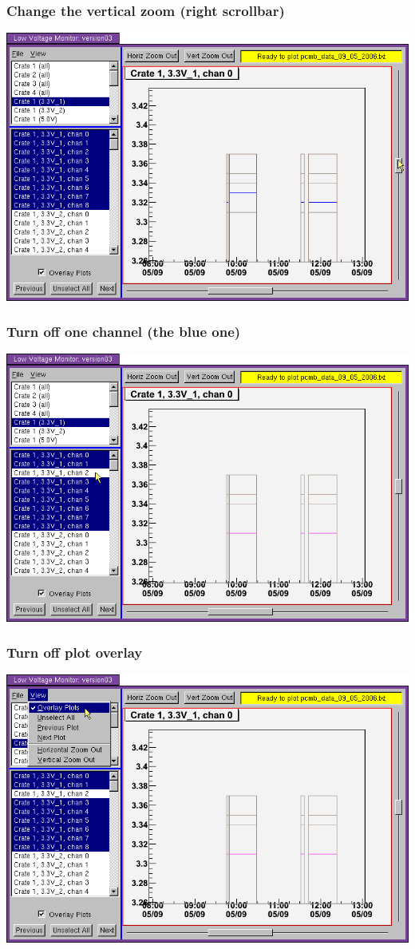 \documentclass[12pt,compress]{beamer}
\begin{document}
\begin{frame}
\frametitle{Change the vertical zoom (right scrollbar)}
\begin{center}
\includegraphics[width=0.9\linewidth]{09.png}
\end{center}
\end{frame}

\begin{frame}
\frametitle{Turn off one channel (the blue one)}
\begin{center}
\includegraphics[width=0.9\linewidth]{10.png}
\end{center}
\end{frame}

\begin{frame}
\frametitle{Turn off plot overlay}
\begin{center}
\includegraphics[width=0.9\linewidth]{11.png}
\end{center}
\end{frame}
\end{document}

